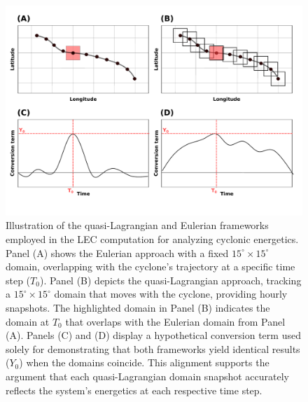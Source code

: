 \begin{figure}[h]
\centering
\includegraphics[width=\linewidth]{fig/LEC_argument.pdf}
\caption[LEC - Discussion]{Illustration of the quasi-Lagrangian and Eulerian frameworks employed in the LEC computation for analyzing cyclonic energetics. Panel (A) shows the Eulerian approach with a fixed \(15^\circ \times 15^\circ\) domain, overlapping with the cyclone's trajectory at a specific time step ($T_0$). Panel (B) depicts the quasi-Lagrangian approach, tracking a \(15^\circ \times 15^\circ\) domain that moves with the cyclone, providing hourly snapshots. The highlighted domain in Panel (B) indicates the domain at $T_0$ that overlaps with the Eulerian domain from Panel (A). Panels (C) and (D) display a hypothetical conversion term used solely for demonstrating that both frameworks yield identical results ($Y_0$) when the domains coincide. This alignment supports the argument that each quasi-Lagrangian domain snapshot accurately reflects the system's energetics at each respective time step.}
\label{fig:lec_argument}
\end{figure}

